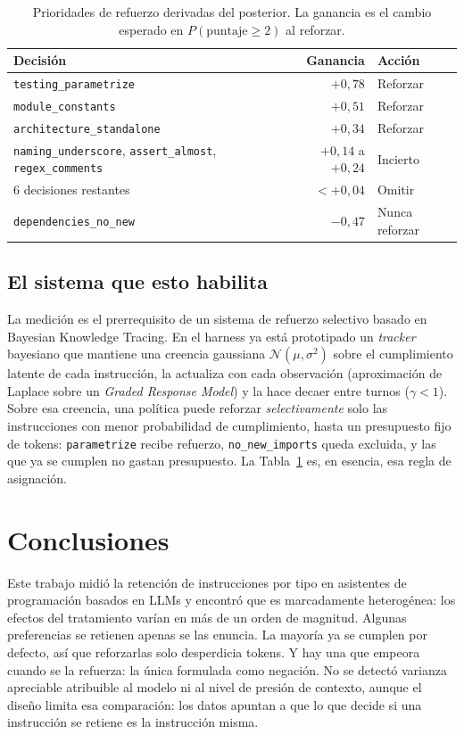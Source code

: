 \documentclass[12pt]{article}
\begin{document}
\begin{table}[h]
  \centering
  \small
  \renewcommand{\arraystretch}{1.15}
  \caption{Prioridades de refuerzo derivadas del posterior. La ganancia es el cambio
  esperado en $P(\text{puntaje}\geq 2)$ al reforzar.}
  \label{tab:res}
  \begin{tabular}{@{}lrl@{}}
    \toprule
    \textbf{Decisión} & \textbf{Ganancia} & \textbf{Acción} \\
    \midrule
    \texttt{testing\_parametrize} & $+0{,}78$ & Reforzar \\
    \texttt{module\_constants}    & $+0{,}51$ & Reforzar \\
    \texttt{architecture\_standalone} & $+0{,}34$ & Reforzar \\
    \texttt{naming\_underscore}, \texttt{assert\_almost}, \texttt{regex\_comments} & $+0{,}14$ a $+0{,}24$ & Incierto \\
    6 decisiones restantes & $<+0{,}04$ & Omitir \\
    \texttt{dependencies\_no\_new} & $-0{,}47$ & Nunca reforzar \\
    \bottomrule
  \end{tabular}
\end{table}

\subsection{El sistema que esto habilita}

La medición es el prerrequisito de un sistema de refuerzo selectivo basado en
Bayesian Knowledge Tracing. En el harness ya está prototipado un \emph{tracker}
bayesiano que mantiene una creencia gaussiana $\mathcal{N}(\mu,\sigma^2)$ sobre el
cumplimiento latente de cada instrucción, la actualiza con cada observación
(aproximación de Laplace sobre un \emph{Graded Response Model}) y la hace decaer
entre turnos ($\gamma<1$). Sobre esa creencia, una política puede reforzar
\emph{selectivamente} solo las instrucciones con menor probabilidad de
cumplimiento, hasta un presupuesto fijo de tokens: \texttt{parametrize} recibe
refuerzo, \texttt{no\_new\_imports} queda excluida, y las que ya se cumplen no
gastan presupuesto. La Tabla~\ref{tab:res} es, en esencia, esa regla de asignación.

\section{Conclusiones}

Este trabajo midió la retención de instrucciones por tipo en asistentes de
programación basados en LLMs y encontró que es marcadamente heterogénea: los
efectos del tratamiento varían en más de un orden de magnitud. Algunas preferencias
se retienen apenas se las enuncia. La mayoría ya se cumplen por defecto, así que
reforzarlas solo desperdicia tokens. Y hay una que empeora cuando se la refuerza:
la única formulada como negación. No se detectó varianza apreciable atribuible al
modelo ni al nivel de presión de contexto, aunque el diseño limita esa comparación:
los datos apuntan a que lo que decide si una instrucción se retiene es la
instrucción misma.
\end{document}
